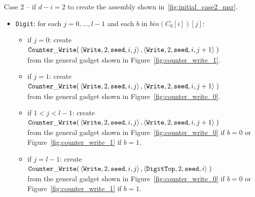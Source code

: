 Case 2 -- if $d - i = 2$ to create the assembly shown in~\ref{fig:initial_case2_msr}.
\begin{itemize}
    \item {\tt Digit}: for each $j=0,\ldots,l-1$ and each $b$ in $bin(C_0[i])[j]$:
    \begin{itemize}
        \item if $j = 0$: create
        $\begin{aligned}[t]
            {\tt Counter\_Write}(&\left\langle {\tt Write}, 2, {\tt seed}, i, j \right\rangle, \left\langle {\tt Write}, 2, {\tt seed}, i, j + 1 \right\rangle \;)
        \end{aligned}$\\from the general gadget shown in Figure~\ref{fig:counter_write_1}.

        \item if $j = 1$: create
        $\begin{aligned}[t]
            {\tt Counter\_Write}(&\left\langle {\tt Write}, 2, {\tt seed}, i, j \right\rangle, \left\langle {\tt Write}, 2, {\tt seed}, i, j + 1 \right\rangle \;)
        \end{aligned}$\\from the general gadget shown in Figure~\ref{fig:counter_write_0}.

        \item if $1 < j < l-1$: create
        $\begin{aligned}[t]
            {\tt Counter\_Write}(&\left\langle {\tt Write}, 2, {\tt seed}, i, j \right\rangle, \left\langle {\tt Write}, 2, {\tt seed}, i, j + 1 \right\rangle \;)
        \end{aligned}$\\from the general gadget shown in Figure~\ref{fig:counter_write_0} if $b = 0$ or Figure~\ref{fig:counter_write_1} if $b = 1$.

        \item if $j = l-1$: create
        $\begin{aligned}[t]
            {\tt Counter\_Write}(&\left\langle {\tt Write}, 2, {\tt seed}, i, j \right\rangle, \left\langle {\tt DigitTop}, 2, {\tt seed}, i \right\rangle \;)
        \end{aligned}$\\from the general gadget shown in Figure~\ref{fig:counter_write_0} if $b = 0$ or Figure~\ref{fig:counter_write_1} if $b = 1$.
    \end{itemize}


\end{itemize}

